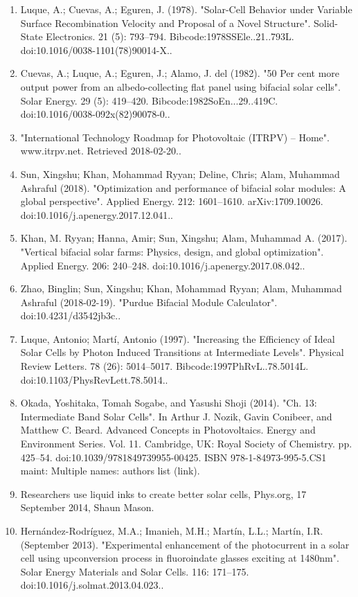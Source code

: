 \begin{enumerate}
\item Luque, A.; Cuevas, A.; Eguren, J. (1978). "Solar-Cell Behavior under Variable Surface Recombination Velocity and Proposal of a Novel Structure". Solid-State Electronics. 21 (5): 793–794. Bibcode:1978SSEle..21..793L. doi:10.1016/0038-1101(78)90014-X..
\item Cuevas, A.; Luque, A.; Eguren, J.; Alamo, J. del (1982). "50 Per cent more output power from an albedo-collecting flat panel using bifacial solar cells". Solar Energy. 29 (5): 419–420. Bibcode:1982SoEn...29..419C. doi:10.1016/0038-092x(82)90078-0..
\item "International Technology Roadmap for Photovoltaic (ITRPV) – Home". www.itrpv.net. Retrieved 2018-02-20..
\item Sun, Xingshu; Khan, Mohammad Ryyan; Deline, Chris; Alam, Muhammad Ashraful (2018). "Optimization and performance of bifacial solar modules: A global perspective". Applied Energy. 212: 1601–1610. arXiv:1709.10026. doi:10.1016/j.apenergy.2017.12.041..
\item Khan, M. Ryyan; Hanna, Amir; Sun, Xingshu; Alam, Muhammad A. (2017). "Vertical bifacial solar farms: Physics, design, and global optimization". Applied Energy. 206: 240–248. doi:10.1016/j.apenergy.2017.08.042..
\item Zhao, Binglin; Sun, Xingshu; Khan, Mohammad Ryyan; Alam, Muhammad Ashraful (2018-02-19). "Purdue Bifacial Module Calculator". doi:10.4231/d3542jb3c..
\item Luque, Antonio; Martí, Antonio (1997). "Increasing the Efficiency of Ideal Solar Cells by Photon Induced Transitions at Intermediate Levels". Physical Review Letters. 78 (26): 5014–5017. Bibcode:1997PhRvL..78.5014L. doi:10.1103/PhysRevLett.78.5014..
\item Okada, Yoshitaka, Tomah Sogabe, and Yasushi Shoji (2014). "Ch. 13: Intermediate Band Solar Cells". In Arthur J. Nozik, Gavin Conibeer, and Matthew C. Beard. Advanced Concepts in Photovoltaics. Energy and Environment Series. Vol. 11. Cambridge, UK: Royal Society of Chemistry. pp. 425–54. doi:10.1039/9781849739955-00425. ISBN 978-1-84973-995-5.CS1 maint: Multiple names: authors list (link).
\item Researchers use liquid inks to create better solar cells, Phys.org, 17 September 2014, Shaun Mason.
\item Hernández-Rodríguez, M.A.; Imanieh, M.H.; Martín, L.L.; Martín, I.R. (September 2013). "Experimental enhancement of the photocurrent in a solar cell using upconversion process in fluoroindate glasses exciting at 1480nm". Solar Energy Materials and Solar Cells. 116: 171–175. doi:10.1016/j.solmat.2013.04.023..

\end{enumerate}
